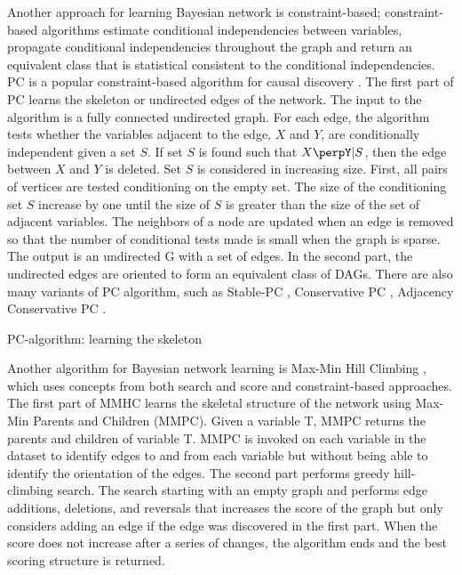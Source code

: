 Another approach for learning Bayesian network is constraint-based; constraint-based algorithms estimate conditional independencies between variables, propagate conditional independencies throughout the graph and return an equivalent class that is statistical consistent to the conditional independencies. PC is a popular constraint-based algorithm for causal discovery \cite{PCAlgo}. The first part of PC learns the skeleton or undirected edges of the network. The input to the algorithm is a fully connected undirected graph. For each edge, the algorithm tests whether the variables adjacent to the edge, $X$ and $Y$, are conditionally independent given a set $S$. If set $S$ is found such that $ X\perpY|S$, then the edge between $X$ and $Y$ is deleted. Set $S$ is considered in increasing size. First, all pairs of vertices are tested conditioning on the empty set. The size of the conditioning set $S$ increase by one until the size of $S$ is greater than the size of the set of adjacent variables. The neighbors of a node are updated when an edge is removed so that the number of conditional tests made is small when the graph is sparse. The output is an undirected G with a set of edges. In the second part, the undirected edges are oriented to form an equivalent class of DAGs. There are also many variants of PC algorithm, such as Stable-PC \cite{PCAlgo}, Conservative PC \cite{CPC}, Adjacency Conservative PC \cite{ACPC}.  

\begin{algorithm}
\caption{PC-algorithm: learning the skeleton}\label{PC}
\begin{algorithmic}[1]
\EndIf
\EndFor
\EndIf
\EndFor 
{}
\EndWhile
\EndProcedure
\end{algorithmic}
\end{algorithm}

Another algorithm for Bayesian network learning is Max-Min Hill Climbing \cite{MMHC}, which uses concepts from both search and score and constraint-based approaches. The first part of MMHC learns the skeletal structure of the network using Max-Min Parents and Children (MMPC). Given a variable T, MMPC returns the parents and children of variable T. MMPC is invoked on each variable in the dataset to identify edges to and from each variable but without being able to identify the orientation of the edges. The second part performs greedy hill-climbing search. The search starting with an empty graph and performs edge additions, deletions, and reversals that increases the score of the graph but only considers adding an edge if the edge was discovered in the first part. When the score does not increase after a series of changes, the algorithm ends and the best scoring structure is returned. 

